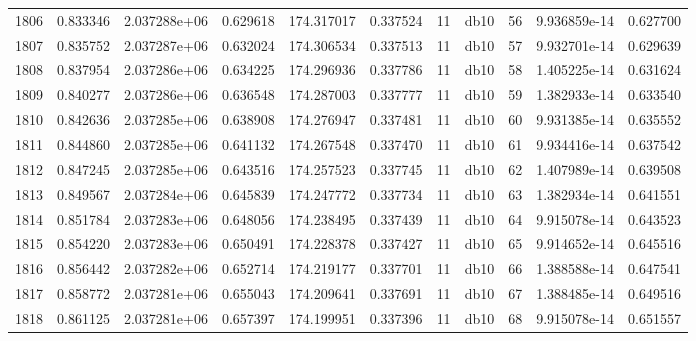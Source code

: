 \begin{tabular}{lrrrrrrlrrr}
1806 &    0.833346 &        2.037288e+06 &  0.629618 &              174.317017 &    0.337524 &      11 &         db10 &     56 &   9.936859e-14 &      0.627700 \\
1807 &    0.835752 &        2.037287e+06 &  0.632024 &              174.306534 &    0.337513 &      11 &         db10 &     57 &   9.932701e-14 &      0.629639 \\
1808 &    0.837954 &        2.037286e+06 &  0.634225 &              174.296936 &    0.337786 &      11 &         db10 &     58 &   1.405225e-14 &      0.631624 \\
1809 &    0.840277 &        2.037286e+06 &  0.636548 &              174.287003 &    0.337777 &      11 &         db10 &     59 &   1.382933e-14 &      0.633540 \\
1810 &    0.842636 &        2.037285e+06 &  0.638908 &              174.276947 &    0.337481 &      11 &         db10 &     60 &   9.931385e-14 &      0.635552 \\
1811 &    0.844860 &        2.037285e+06 &  0.641132 &              174.267548 &    0.337470 &      11 &         db10 &     61 &   9.934416e-14 &      0.637542 \\
1812 &    0.847245 &        2.037285e+06 &  0.643516 &              174.257523 &    0.337745 &      11 &         db10 &     62 &   1.407989e-14 &      0.639508 \\
1813 &    0.849567 &        2.037284e+06 &  0.645839 &              174.247772 &    0.337734 &      11 &         db10 &     63 &   1.382934e-14 &      0.641551 \\
1814 &    0.851784 &        2.037283e+06 &  0.648056 &              174.238495 &    0.337439 &      11 &         db10 &     64 &   9.915078e-14 &      0.643523 \\
1815 &    0.854220 &        2.037283e+06 &  0.650491 &              174.228378 &    0.337427 &      11 &         db10 &     65 &   9.914652e-14 &      0.645516 \\
1816 &    0.856442 &        2.037282e+06 &  0.652714 &              174.219177 &    0.337701 &      11 &         db10 &     66 &   1.388588e-14 &      0.647541 \\
1817 &    0.858772 &        2.037281e+06 &  0.655043 &              174.209641 &    0.337691 &      11 &         db10 &     67 &   1.388485e-14 &      0.649516 \\
1818 &    0.861125 &        2.037281e+06 &  0.657397 &              174.199951 &    0.337396 &      11 &         db10 &     68 &   9.915078e-14 &      0.651557 \\

\end{tabular}
